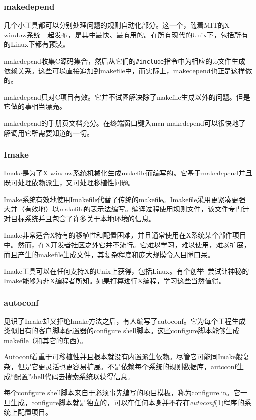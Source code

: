 \documentclass[12pt,oneside]{ctexbook}
\begin{document}
\begin{common-format}
\subsubsection{makedepend}
几个小工具都可以分别处理问题的规则自动化部分。这一个，随着MIT的X window系统一起发布，是其中最快、最有用的。在所有现代的Unix下，包括所有的Linux下都有预装。

makedepend收集C源码集合，然后从它们的\verb+#include+指令中为相应的.o文件生成依赖关系。这些可以直接追加到makefile中，而实际上，makedepend也正是这样做的。

makedepend只对C项目有效。它并不试图解决除了makefile生成以外的问题。但是它做的事相当漂亮。

makedepend的手册页文档充分。在终端窗口键入man makedepend可以很快地了解调用它所需要知道的一切。

\subsubsection{Imake}
Imake是为了X window系统机械化生成makefile而编写的。它基于makedepend并且既可处理依赖派生，又可处理移植性问题。

Imake系统有效地使用Imakefile代替了传统的makefile。Imakefile采用更紧凑更强大并（有效地）以makefile的表示法编写。编译过程使用规则文件，该文件专门针对目标系统并且包含了许多关于本地环境的信息。

Imake非常适合X特有的移植性和配置困难，并且通常使用在X系统某个部件项目中。然而，在X开发者社区之外它并不流行。它难以学习，难以使用，难以扩展，而且产生的makefile生成文件，其复杂程度和庞大规模令人目瞪口呆。

Imake工具可以在任何支持X的Unix上获得，包括Linux。有个创举~\cite{DuBois}尝试让神秘的Imake能够为非X编程者所知。如果打算进行X编程，学习这些当然值得。

\subsubsection{autoconf}
见识了Imake却又拒绝Imake方法之后，有人编写了autoconf。它为每个工程生成类似旧有的客户脚本配置器的configure shell脚本。这些configure脚本能够生成makefile（和其它的东西）。

Autoconf着重于可移植性并且根本就没有内置派生依赖。尽管它可能同Imake般复杂，但是它更灵活也更容易扩展。不是依赖每个系统的规则数据库，autoconf生成“配置”shell代码去搜索系统以获得信息。

每个configure shell脚本来自于必须事先编写的项目模板，称为configure.in。它一旦生成，configure脚本就是独立的，可以在任何本身并不存在\textit{autoconf}(1)程序的系统上配置项目。


\end{common-format}
\end{document}

